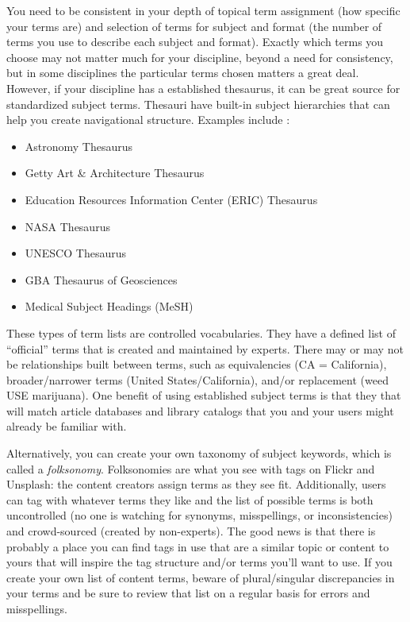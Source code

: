 \documentclass[10pt,letterpaper]{article}
\begin{document}
You need to be consistent in your depth of
topical term assignment (how specific your terms are) and selection of
terms for subject and format (the number of terms you use to describe
each subject and format). Exactly which terms you choose may not matter
much for your discipline, beyond a need for consistency, but in some
disciplines the particular terms chosen matters a great deal. However,
if your discipline has a established thesaurus, it can be great source
for standardized subject terms. Thesauri have built-in subject
hierarchies that can help you create navigational structure. Examples
include \cite{ASI2020}:

\begin{itemize}
\item
  Astronomy Thesaurus
\item
  Getty Art \& Architecture Thesaurus
\item
  Education Resources Information Center (ERIC) Thesaurus
\item
  NASA Thesaurus
\item
  UNESCO Thesaurus
\item
  GBA Thesaurus of Geosciences
\item
  Medical Subject Headings (MeSH)
\end{itemize}

These types of term lists are controlled vocabularies. They have a
defined list of ``official'' terms that is created and maintained by
experts. There may or may not be relationships built between terms, such
as equivalencies (CA = California), broader/narrower terms (United
States/California), and/or replacement (weed USE marijuana). One benefit
of using established subject terms is that they that will match article
databases and library catalogs that you and your users might already be
familiar with.

Alternatively, you can create your own taxonomy of subject keywords,
which is called a \emph{folksonomy}. Folksonomies are what you see with
tags on Flickr and Unsplash: the content creators assign terms as they
see fit. Additionally, users can tag with whatever terms they like and
the list of possible terms is both uncontrolled (no one is watching for
synonyms, misspellings, or inconsistencies) and crowd-sourced (created
by non-experts). The good news is that there is probably a place you can
find tags in use that are a similar topic or content to yours that will
inspire the tag structure and/or terms you'll want to use. If you create
your own list of content terms, beware of plural/singular discrepancies
in your terms and be sure to review that list on a regular basis for
errors and misspellings.
\end{document}
